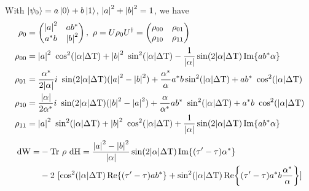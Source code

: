 	With $\ket{\psi_0} = a \ket{0} + b \ket{1}$,  $\abs{a}^2 + \abs{b}^2 = 1$, we  have
\begin{align*}
	\rho_0 & = \begin{pmatrix}
	\abs{a}^2 & a b ^* \\
	a^* b & \abs{b}^2 \\
	\end{pmatrix}, \ \rho = U \rho_0 U^\dagger = 
	\begin{pmatrix}
	\rho_{00} & \rho_{01} \\
	\rho_{10} & \rho_{11} \\
	\end{pmatrix}  \\
	\rho_{00} & = \abs{a}^2 \ \cos^2(\abs{\alpha} \Delta \mathrm{T}) + \abs{b}^2 \ \sin^2(\abs{\alpha} \Delta \mathrm{T}) - \frac{1}{\abs{\alpha}} \sin(2 \abs{\alpha} \Delta \mathrm{T}) \Im{a b^* \alpha} \\
	\rho_{01} & = \frac{\alpha^*}{2 \abs{\alpha}} i \ \sin(2 \abs{\alpha} \Delta \mathrm{T}) (\abs{a}^2 - \abs{b}^2) + \frac{\alpha^*}{\alpha} a^* b \sin^2(\abs{\alpha} \Delta \mathrm{T}) + a b^* \ \cos^2(\abs{\alpha} \Delta \mathrm{T}) \\
	\rho_{10} & = 	\frac{\abs{\alpha}}{2 \alpha^*} i \ \sin(2 \abs{\alpha} \Delta \mathrm{T}) (\abs{b}^2 - \abs{a}^2) + \frac{\alpha}{\alpha^*} a b^* \ \sin^2(\abs{\alpha} \Delta \mathrm{T}) + a^* b \ \cos^2(\abs{\alpha} \Delta \mathrm{T}) \\
	\rho_{11} & = \abs{a}^2 \ \sin^2(\abs{\alpha} \Delta \mathrm{T}) + \abs{b}^2 \ \cos^2(\abs{\alpha} \Delta \mathrm{T}) + \frac{1}{\abs{\alpha}} \sin(2 \abs{\alpha} \Delta \mathrm{T}) \Im{a b^* \alpha}
\end{align*}
\begin{align*}
	\mathrm{dW} = & - \mathrm{Tr} \ \rho \ \mathrm{dH} = \frac{\abs{a}^2 - \abs{b}^2}{\abs{\alpha}} \sin(2 \abs{\alpha} \Delta \mathrm{T}) \Im{(\tau' - \tau) \alpha^*} \\
	& - 2 \ [\cos^2(\abs{\alpha} \Delta \mathrm{T}) \Re{(\tau' - \tau) a b^*} 
	+ \sin^2(\abs{\alpha} \Delta \mathrm{T}) \Re{(\tau' - \tau)a^* b \frac{\alpha^*}{\alpha}} ]
\end{align*}